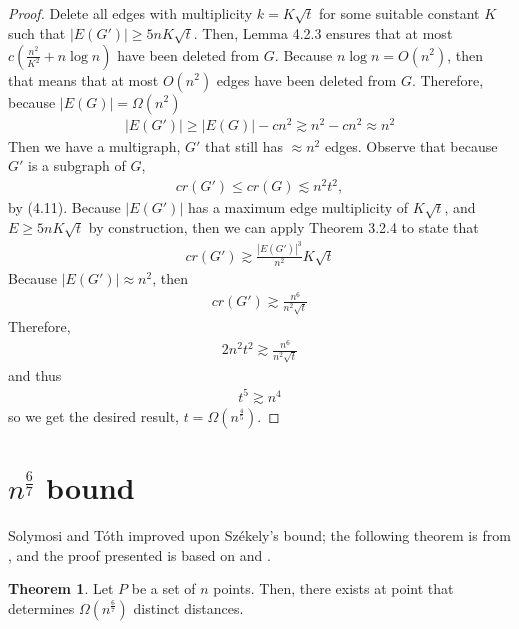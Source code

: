 \documentclass{scrippsthesisclass}
\theoremstyle{definition}
\newtheorem{theorem}{Theorem}[section]
\begin{document}
\begin{proof}
Delete all edges with multiplicity $k = K\sqrt{t}$ for some suitable constant $K$ such that $|E(G')| \geq 5nK\sqrt{t}$.
Then, Lemma 4.2.3 ensures that at most $c\left(\frac{n^2}{K^2} + n \log n\right)$ have been deleted from $G$.
Because $n \log n = O(n^2)$, then that means that at most $O(n^2)$ edges have been deleted from $G$.
Therefore, because $|E(G)| = \Omega(n^2)$
\begin{align}
|E(G')| \geq |E(G)| - cn^2 \gtrsim n^2 - cn^2 \approx n^2
\end{align}
Then we have a multigraph, $G'$ that still has $\approx n^2$ edges. 
Observe that because $G'$ is a subgraph of $G$,
\begin{align}
    cr(G') \leq cr(G) \lesssim n^2t^2,
\end{align}
by (4.11).
Because $|E(G')|$ has a maximum edge multiplicity of $K\sqrt{t}$, and $E \geq 5nK\sqrt{t}$ by construction, then we can apply Theorem 3.2.4 to state that 
\begin{align}
cr(G') \gtrsim \frac{|E(G')|^3}{n^2}{K\sqrt{t}}
\end{align}
Because $|E(G')| \approx n^2$, then 
\begin{align}
cr(G') \gtrsim \frac{n^6}{n^2\sqrt{t}}
\end{align}
Therefore, 
\begin{align}
2n^2t^2 \gtrsim \frac{n^6}{n^2 \sqrt{t}}
\end{align}
and thus
\begin{align}
t^5 \gtrsim n^4
\end{align}
so we get the desired result, $t = \Omega\left(n^{\frac{4}{5}}\right)$.
\end{proof}

\newpage
\section{$n^{\frac{6}{7}}$ bound}
Solymosi and T\'{o}th improved upon Sz\'{e}kely's bound; the following theorem is from \cite{Solymosi}, and the proof presented is based on \cite{Solymosi} and \cite{thebook}. 
\begin{theorem}
    Let $P$ be a set of $n$ points. 
    Then, there exists at point that determines $\Omega\left(n^{\frac{6}{7}}\right)$ distinct distances. 
\end{theorem}
\end{document}
